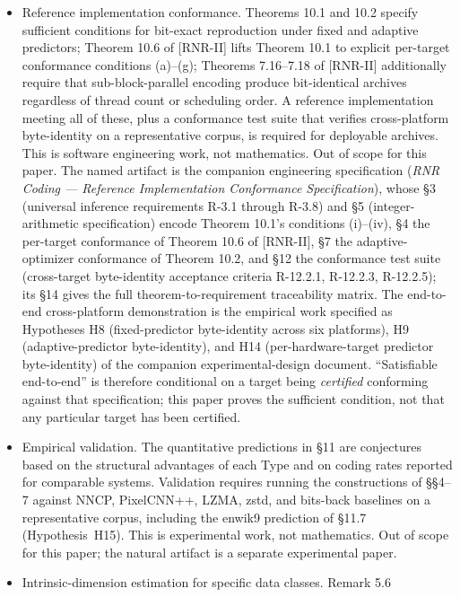 \documentclass[
]{article}
\begin{document}
\begin{itemize}
\item
  Reference implementation conformance. Theorems 10.1 and 10.2 specify
  sufficient conditions for bit-exact reproduction under fixed and
  adaptive predictors; Theorem 10.6 of [RNR-II] lifts Theorem 10.1 to explicit
  per-target conformance conditions (a)--(g); Theorems 7.16--7.18 of [RNR-II]
  additionally require that sub-block-parallel encoding produce
  bit-identical archives regardless of thread count or scheduling order.
  A reference implementation meeting all of these, plus a conformance
  test suite that verifies cross-platform byte-identity on a
  representative corpus, is required for deployable archives. This is
  software engineering work, not mathematics. Out of scope for this
  paper. The named artifact is the companion engineering specification
  (\emph{RNR Coding --- Reference Implementation Conformance
  Specification}), whose §3 (universal inference requirements R-3.1
  through R-3.8) and §5 (integer-arithmetic specification) encode
  Theorem 10.1's conditions (i)--(iv), §4 the per-target conformance of
  Theorem 10.6 of [RNR-II], §7 the adaptive-optimizer conformance of Theorem 10.2,
  and §12 the conformance test suite (cross-target byte-identity
  acceptance criteria R-12.2.1, R-12.2.3, R-12.2.5); its §14 gives the
  full theorem-to-requirement traceability matrix. The end-to-end
  cross-platform demonstration is the empirical work specified as
  Hypotheses H8 (fixed-predictor byte-identity across six platforms),
  H9 (adaptive-predictor byte-identity), and H14 (per-hardware-target
  predictor byte-identity) of the companion experimental-design
  document. ``Satisfiable end-to-end'' is therefore conditional on a
  target being \emph{certified} conforming against that specification;
  this paper proves the sufficient condition, not that any particular
  target has been certified.
\item
  Empirical validation. The quantitative predictions in §11 are
  conjectures based on the structural advantages of each Type and on
  coding rates reported for comparable systems. Validation requires
  running the constructions of §§4--7 against NNCP, PixelCNN++, LZMA,
  zstd, and bits-back baselines on a representative corpus, including
  the enwik9 prediction of §11.7 (Hypothesis~H15). This is
  experimental work, not mathematics. Out of scope for this paper; the
  natural artifact is a separate experimental paper.
\item
  Intrinsic-dimension estimation for specific data classes. Remark 5.6

\end{itemize}
\end{document}
